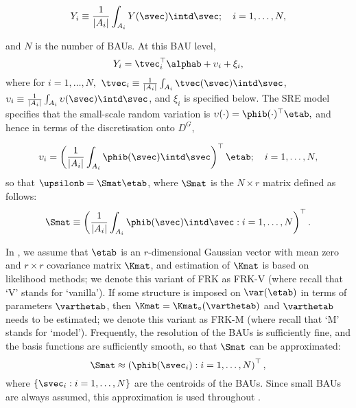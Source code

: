 \begin{equation}\label{eq:Yi0}
Y_i \equiv \frac{1}{|A_i|}\int_{A_i} Y(\svec) \intd \svec; \quad i = 1,\dots,N,
\end{equation}

\noindent and $N$ is the number of BAUs. At this BAU level,
\begin{equation} \label{eq:Yi1}
Y_i = \tvec_i^\top\alphab + \upsilon_i + \xi_i,
\end{equation}
\noindent where for $i = 1,\dots, N,$ $\tvec_i \equiv \frac{1}{|A_i|}\int_{A_i} \tvec(\svec) \intd \svec$, $\upsilon_i\equiv \frac{1}{|A_i|}\int_{A_i} \upsilon(\svec) \intd \svec$, and $\xi_i$ is specified below. The SRE model specifies that the small-scale random variation is $\upsilon(\cdot) = \phib(\cdot)^\top\etab,$ and hence in terms of the discretisation onto $D^G$,


$$
\upsilon_i = \left(\frac{1}{|A_i|}\int_{A_i}\phib(\svec)\intd \svec\right)^\top \etab; \quad i = 1,\dots,N,
$$
\noindent so that $\upsilonb = \Smat\etab$, where $\Smat$ is the $N \times r$ matrix defined as follows:
\begin{equation}\label{eq:S_integral}
\Smat \equiv \left(\frac{1}{|A_i|}\int_{A_i}\phib(\svec)\intd\svec : i = 1,\dots,N\right)^\top.
\end{equation}

In , we assume that $\etab$ is an $r$-dimensional Gaussian vector with mean zero and $r \times r$ covariance matrix $\Kmat$, and estimation of $\Kmat$ is based on likelihood methods; we denote this variant of FRK as FRK-V (where recall that `V' stands for `vanilla'). If some structure is imposed on $\var(\etab)$ in terms of parameters $\varthetab$, then $\Kmat = \Kmat_\circ(\varthetab)$ and $\varthetab$ needs to be estimated; we denote this variant as FRK-M (where recall that `M' stands for `model'). Frequently, the resolution of the BAUs is sufficiently fine, and the basis functions are sufficiently smooth, so that $\Smat$ can be approximated:
\begin{equation}\label{eq:Sapprox}
\Smat \approx \left(\phib(\svec_i) : i = 1,\dots,N\right)^\top,
\end{equation}
where $\{\svec_i: i = 1,\dots,N\}$ are the centroids of the BAUs. Since small BAUs are always assumed, this approximation is used throughout .

